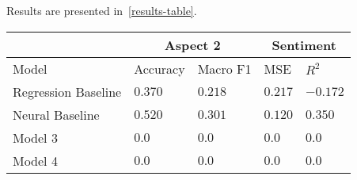 Results are presented in~\ref{results-table}.

\begin{table*}
    \small
    \caption{Test Error Rates and F1 Scores for Classification, test MSE and R2 for Regression}
    \label{results-table}
    \centering
    \begin{tabular}{lllll}
        \multicolumn{1}{c}{} & \multicolumn{2}{c}{Aspect 2} & \multicolumn{2}{c}{Sentiment}\\
        \hline
        Model                   & Accuracy         & Macro F1         & MSE              & $R^2$ \\
        \midrule
        Regression Baseline     & $0.370$          & $0.218$          & $0.217$          & $-0.172$          \\
        Neural Baseline         & $\mathbf{0.520}$ & $\mathbf{0.301}$ & $\mathbf{0.120}$ & $\mathbf{0.350}$  \\
        Model 3                 & $0.0$            & $0.0$            & $0.0$            & $0.0$             \\
        Model 4                 & $0.0$            & $0.0$            & $0.0$            & $0.0$             \\
        \bottomrule
    \end{tabular}
\end{table*}
